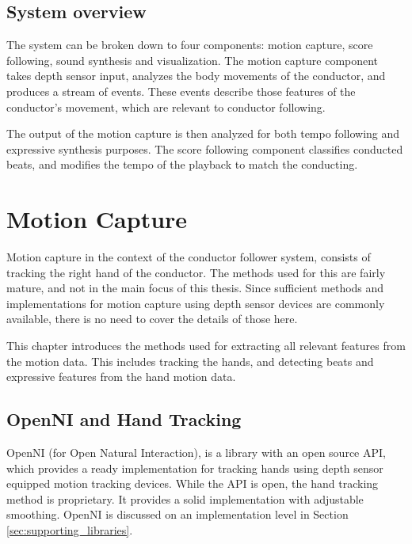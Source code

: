 
\section{System overview}

The system can be broken down to four components:
motion capture, score following, sound synthesis
and visualization.
The motion capture component
takes depth sensor input,
analyzes the body movements of the conductor,
and produces a stream of events.
These events describe those features of the conductor's movement,
which are relevant to conductor following.

The output of the motion capture is then analyzed
for both tempo following and expressive synthesis purposes.
The score following component classifies conducted beats,
and modifies the tempo of the playback to match the conducting.


\chapter{Motion Capture}
\label{chapter:motion_capture}

Motion capture in the context of the conductor follower system,
consists of tracking the right hand of the conductor.
The methods used for this are fairly mature,
and not in the main focus of this thesis.
Since sufficient methods and implementations for
motion capture using depth sensor devices
are commonly available,
there is no need to cover the details of those here.

This chapter introduces the methods used for
extracting all relevant features from the motion data.
This includes tracking the hands,
and detecting beats and expressive features
from the hand motion data.

\section{OpenNI and Hand Tracking}

OpenNI (for Open Natural Interaction),
is a library with an open source API,
which provides
a ready implementation for tracking hands
using depth sensor equipped motion tracking devices.
While the API is open, 
the hand tracking method is proprietary.
It provides a solid implementation
with adjustable smoothing.
OpenNI is discussed on an implementation level in Section
\ref{sec:supporting_libraries}.

